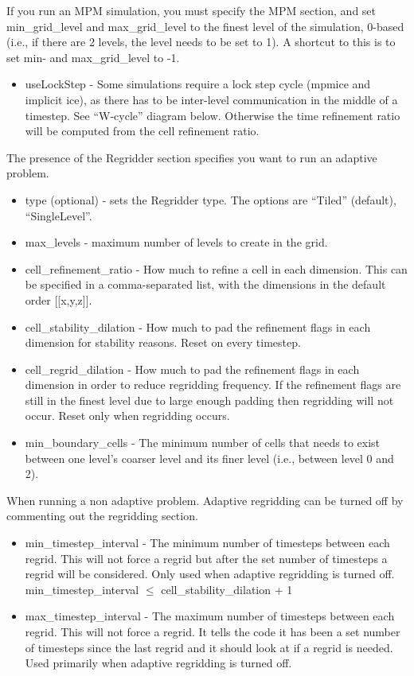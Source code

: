 If you run an MPM simulation, you must specify the MPM section, and
set min\_grid\_level and max\_grid\_level to the finest level of the
simulation, 0-based (i.e., if there are 2 levels, the level needs to
be set to 1). A shortcut to this is to set min- and max\_grid\_level to
-1.

\begin{itemize}
\item useLockStep - Some simulations require a lock step cycle (mpmice
  and implicit ice), as there has to be inter-level communication in
  the middle of a timestep. See ``W-cycle'' diagram below. Otherwise the
  time refinement ratio will be computed from the cell refinement
  ratio.
\end{itemize}


The presence of the Regridder section specifies you want to run an
adaptive problem.
\begin{itemize}
  \item type (optional) - sets the Regridder type. The options are
   ``Tiled'' (default), ``SingleLevel''.
 \item max\_levels - maximum number of levels to create in the grid.
 \item cell\_refinement\_ratio - How much to refine a cell in each
   dimension. This can be specified in a comma-separated list, with the dimensions in the default order [[x,y,z]].
    \item cell\_stability\_dilation - How much to pad the refinement flags
   in each dimension for stability reasons.  Reset on every timestep.
 \item cell\_regrid\_dilation - How much to pad the refinement flags in
   each dimension in order to reduce regridding frequency. If the refinement flags are still in the finest level due to large enough padding then regridding will not occur. Reset only when regridding occurs.
 \item min\_boundary\_cells - The minimum number of cells that needs to
   exist between one level's coarser level and its finer level (i.e.,
   between level 0 and 2).
\end{itemize}

When running a non adaptive problem. Adaptive regridding can be turned off by commenting out the regridding section.
\begin{itemize}
  \item min\_timestep\_interval - The minimum number of timesteps between each regrid. This will not force a regrid but after the set number of timesteps a regrid will be considered. Only used when adaptive regridding is turned off. min\_timestep\_interval $\leq$ cell\_stability\_dilation + 1
  \item max\_timestep\_interval - The maximum number of timesteps between each regrid.  This will not force a regrid.
 It tells the code it has been a set number of timesteps since the last regrid and it should look at if a regrid is needed. Used primarily when adaptive regridding is turned off.
\end{itemize}

